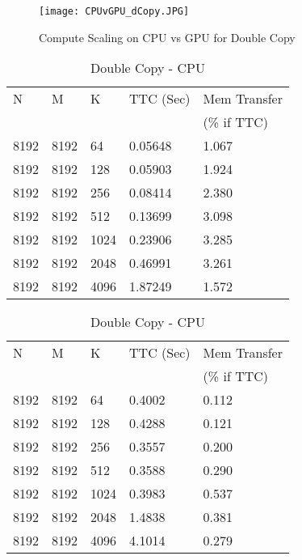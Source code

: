 \documentclass[14pt,fleqn]{article}
\begin{document}
\begin{figure}
\centering
\texttt{[image: CPUvGPU\_dCopy.JPG]}
\caption{Compute Scaling on CPU vs GPU for Double Copy}
\end{figure}

\begin{table}
\begin{subtable}[l]{0.48\textwidth}
\begin{center}
\begin{tabular}{|l|l|l|l|l|}                                  
    \hline\hline
    N  & M & K & TTC (Sec) & Mem Transfer\\
       &   &   &           & (\% if TTC) \\
    \hline\hline
    8192 & 8192 & 64 & 0.05648 & 1.067\\ \hline
    8192 & 8192 & 128 & 0.05903 & 1.924\\ \hline
    8192 & 8192 & 256 & 0.08414 & 2.380\\ \hline
    8192 & 8192 & 512 & 0.13699 & 3.098\\ \hline
    8192 & 8192 & 1024 & 0.23906 & 3.285\\ \hline
    8192 & 8192 & 2048 & 0.46991 & 3.261\\ \hline
    8192 & 8192 & 4096 & 1.87249 & 1.572\\ \hline

\end{tabular} 
\end{center}
\caption{Double Copy - GPU}

\end{subtable}
\begin{subtable}[l]{0.48\textwidth}
\begin{center}
\begin{tabular}{|l|l|l|l|l|}                                   
    \hline\hline         
    N  & M & K & TTC (Sec) & Mem Transfer\\
       &   &   &           & (\% if TTC) \\
    \hline\hline
    8192 & 8192 & 64 & 0.4002 & 0.112\\ \hline
    8192 & 8192 & 128 & 0.4288 & 0.121\\ \hline
    8192 & 8192 & 256 & 0.3557 & 0.200\\ \hline
    8192 & 8192 & 512 & 0.3588 & 0.290\\ \hline
    8192 & 8192 & 1024 & 0.3983 & 0.537\\ \hline
    8192 & 8192 & 2048 & 1.4838 & 0.381\\ \hline
    8192 & 8192 & 4096 & 4.1014 & 0.279\\ \hline

\end{tabular}
\end{center}
\caption{Double Copy - CPU}
\end{subtable}
\end{table}
\end{document}

